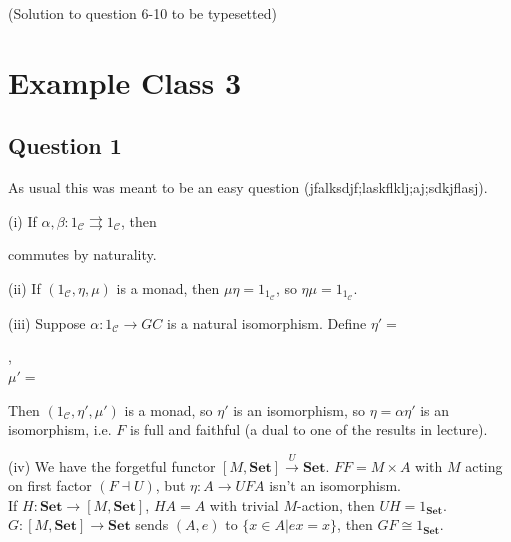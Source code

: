 \documentclass[a4paper]{article}
\begin{document}
(Solution to question 6-10 to be typesetted)

\newpage

\section{Example Class 3}

\subsection{Question 1}
As usual this was meant to be an easy question (jfalksdjf;laskflklj;aj;sdkjflasj).

(i) If $\alpha,\beta:1_\mathcal{C} \rightrightarrows 1_\mathcal{C}$, then


commutes by naturality.

(ii) If $(1_\mathcal{C},\eta,\mu)$ is a monad, then $\mu\eta = 1_{1_\mathcal{C}}$, so $\eta \mu = 1_{1_\mathcal{C}}$.

(iii) Suppose $\alpha:1_\mathcal{C} \to GC$ is a natural isomorphism. Define $\eta' = $
,\\
$\mu'=$

Then $(1_\mathcal{C},\eta',\mu')$ is a monad, so $\eta'$ is an isomorphism, so $\eta = \alpha\eta'$ is an isomorphism, i.e. $F$ is full and faithful (a dual to one of the results in lecture).

(iv) We have the forgetful functor $[M,\mathbf{Set}] \xrightarrow{U} \mathbf{Set}$. $FF = M \times A$ with $M$ acting on first factor $(F \dashv U)$, but $\eta:A \to UFA$ isn't an isomorphism.\\
If $H:\mathbf{Set} \to [M,\mathbf{Set}]$, $HA = A$ with trivial $M$-action, then $UH = 1_{\mathbf{Set}}$.\\
$G:[M,\mathbf{Set}] \to \mathbf{Set}$ sends $(A,e)$ to $\{x \in A | ex = x\}$, then $GF \cong 1_{\mathbf{Set}}$.
\end{document}
